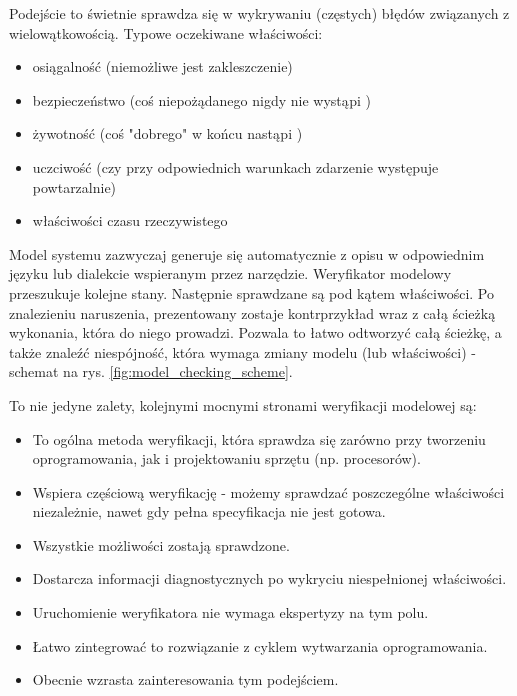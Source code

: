 Podejście to świetnie sprawdza się w wykrywaniu (częstych) błędów związanych z wielowątkowością. Typowe oczekiwane właściwości:
\begin{itemize}
\item osiągalność (niemożliwe jest zakleszczenie)
\item bezpieczeństwo (coś niepożądanego nigdy nie wystąpi \cite{Alp87})
\item żywotność (coś "dobrego" w końcu nastąpi \cite{Alp85})
\item uczciwość (czy przy odpowiednich warunkach zdarzenie występuje powtarzalnie)
\item właściwości czasu rzeczywistego
\end{itemize}

\vspace{0.5cm}
Model systemu zazwyczaj generuje się automatycznie z opisu w odpowiednim języku lub dialekcie wspieranym przez narzędzie. 
Weryfikator modelowy przeszukuje kolejne stany. Następnie sprawdzane są pod kątem właściwości. Po znalezieniu naruszenia, prezentowany zostaje kontrprzykład wraz z całą ścieżką wykonania, która do niego prowadzi. Pozwala to łatwo odtworzyć całą ścieżkę, a także znaleźć niespójność, która wymaga zmiany modelu (lub właściwości) - schemat na rys. \ref{fig:model_checking_scheme}.

\vspace{0.5cm}
\noindent
To nie jedyne zalety, kolejnymi mocnymi stronami weryfikacji modelowej są:
\begin{itemize}
\item To ogólna metoda weryfikacji, która sprawdza się zarówno przy tworzeniu oprogramowania, jak i projektowaniu sprzętu (np. procesorów).
\item Wspiera częściową weryfikację - możemy sprawdzać poszczególne właściwości niezależnie, nawet gdy pełna specyfikacja nie jest gotowa.
\item Wszystkie możliwości zostają sprawdzone.
\item Dostarcza informacji diagnostycznych po wykryciu niespełnionej właściwości.
\item Uruchomienie weryfikatora nie wymaga ekspertyzy na tym polu.
\item Łatwo zintegrować to rozwiązanie z cyklem wytwarzania oprogramowania.
\item Obecnie wzrasta zainteresowania tym podejściem.
\end{itemize}

